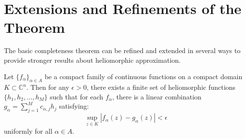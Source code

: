 \section{Extensions and Refinements of the Theorem}

The basic completeness theorem can be refined and extended in several ways to provide stronger results about heliomorphic approximation.

\begin{theorem}
Let $\{f_{\alpha}\}_{\alpha \in A}$ be a compact family of continuous functions on a compact domain $K \subset \mathbb{C}^n$. Then for any $\epsilon > 0$, there exists a finite set of heliomorphic functions $\{h_1, h_2, \ldots, h_M\}$ such that for each $f_{\alpha}$, there is a linear combination $g_{\alpha} = \sum_{j=1}^{M} c_{\alpha,j}h_j$ satisfying:
\begin{equation}
\sup_{z \in K} |f_{\alpha}(z) - g_{\alpha}(z)| < \epsilon
\end{equation}
uniformly for all $\alpha \in A$.
\end{theorem}


